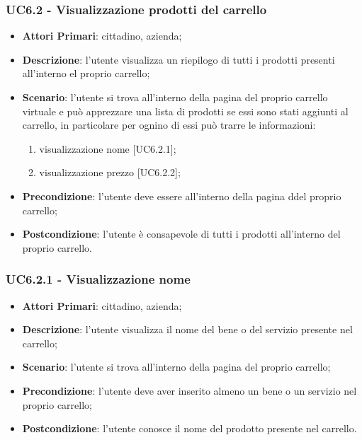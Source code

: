  \subsubsection{UC6.2 - Visualizzazione prodotti del carrello}
\begin{itemize}
	\item \textbf{Attori Primari}: cittadino, azienda\glo;
	\item \textbf{Descrizione}: l'utente visualizza un riepilogo di tutti i prodotti presenti all'interno el proprio carrello;
	\item \textbf{Scenario}: l'utente si trova all'interno della pagina del proprio carrello virtuale e può apprezzare una lista di prodotti se essi sono stati aggiunti al carrello, in particolare per ognino di essi può trarre le informazioni:
	 \begin{enumerate}[label=\alph*.]
		\item visualizzazione nome [UC6.2.1];
		\item visualizzazione prezzo [UC6.2.2];
	\end{enumerate} 
	\item \textbf{Precondizione}: l'utente deve essere all'interno della pagina ddel proprio carrello;
	\item \textbf{Postcondizione}: l'utente è consapevole di tutti i prodotti all'interno del proprio carrello.
\end{itemize}
 \subsubsection{UC6.2.1 - Visualizzazione nome}
\begin{itemize}
	\item \textbf{Attori Primari}: cittadino, azienda\glo;
	\item \textbf{Descrizione}: l'utente visualizza il nome del bene o del servizio presente nel carrello;
	\item \textbf{Scenario}: l'utente si trova all'interno della pagina del proprio carrello;
	\item \textbf{Precondizione}: l'utente deve aver inserito almeno un bene o un servizio nel proprio carrello;
	\item \textbf{Postcondizione}: l'utente conosce il nome del prodotto presente nel carrello.
\end{itemize}
